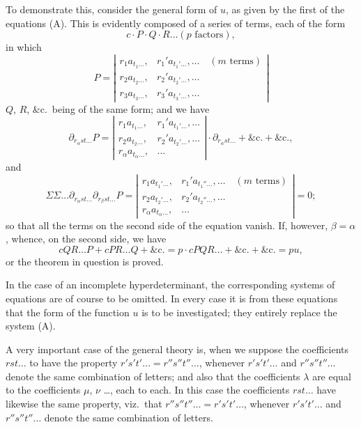 \documentclass[11pt,a4paper]{book}
\begin{document}
To demonstrate this, consider the general form of $u$, as given by the first of the
equations (A). This is evidently composed of a series of terms, each of the form
\[
c \cdot P \cdot Q \cdot R \ldots (p \text{ factors}),
\]
in which
\[
P = \left|\begin{array}{cc}
r_1 a_{t_1 \ldots}, & r_1' a_{t_1' \ldots}, \ldots \quad (m \text{ terms}) \\
r_2 a_{t_2 \ldots}, & r_2' a_{t_2' \ldots}, \ldots \\
r_3 a_{t_3 \ldots}, & r_3' a_{t_3' \ldots}, \ldots
\end{array}\right|
\]
$Q$, $R$, \&c.\ being of the same form; and we have
\[
\partial_{r_\alpha st\ldots} P = \left|\begin{array}{cc}
r_1 a_{t_1 \ldots}, & r_1' a_{t_1' \ldots}, \ldots \\
r_2 a_{t_2 \ldots}, & r_2' a_{t_2' \ldots}, \ldots \\
r_\alpha a_{t_\alpha \ldots}, & \ldots
\end{array}\right| \cdot \partial_{r_\alpha st\ldots} + \&\text{c.} + \&\text{c.},
\]
and
\[
\Sigma \Sigma \ldots \partial_{r_\alpha st\ldots} \partial_{r_\beta st\ldots} P =
\left|\begin{array}{cc}
r_1 a_{t_1' \ldots}, & r_1' a_{t_1'' \ldots}, \ldots \quad (m \text{ terms}) \\
r_2 a_{t_2' \ldots}, & r_2' a_{t_2'' \ldots}, \ldots \\
r_\alpha a_{t_\alpha \ldots}, & \ldots
\end{array}\right| = 0;
\]
so that all the terms on the second side of the equation vanish. If, however, $\beta = \alpha$,
whence, on the second side, we have
\[
cQR\ldots P + cPR\ldots Q + \&\text{c.} = p \cdot cPQR\ldots + \&\text{c.} + \&\text{c.}
= pu,
\]
or the theorem in question is proved.

In the case of an incomplete hyperdeterminant, the corresponding systems of
equations are of course to be omitted. In every case it is from these equations that
the form of the function $u$ is to be investigated; they entirely replace the system (A).

A very important case of the general theory is, when we suppose the coefficients
$rst\ldots$ to have the property $r's't'\ldots = r''s''t''\ldots$, whenever $r's't'\ldots$ and $r''s''t''\ldots$ denote
the same combination of letters; and also that the coefficients $\lambda$ are equal to the
coefficients $\mu$, $\nu$ \ldots, each to each. In this case the coefficients $rst\ldots$ have likewise
the same property, viz.\ that $r''s''t''\ldots = r's't'\ldots$, whenever $r's't'\ldots$ and $r''s''t''\ldots$ denote
the same combination of letters.
\end{document}
